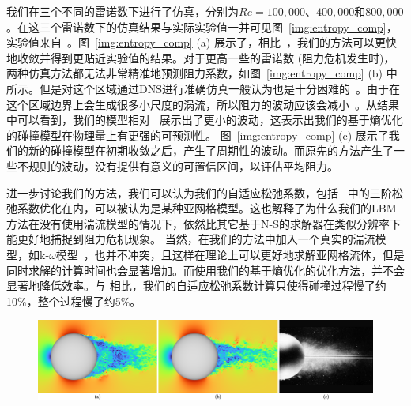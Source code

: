 我们在三个不同的雷诺数下进行了仿真，分别为$Re=100,000$、$400,000$和$800,000$。在这三个雷诺数下的仿真结果与实际实验值一并可见图~\ref{img:entropy_comp}，实验值来自~\cite{Barati-2014}。图~\ref{img:entropy_comp} (a) 展示了，相比~\cite{Geier-2017}，我们的方法可以更快地收敛并得到更贴近实验值的结果。对于更高一些的雷诺数 (阻力危机发生时)，两种仿真方法都无法非常精准地预测阻力系数，如图~\ref{img:entropy_comp} (b) 中所示。但是对这个区域通过DNS进行准确仿真一般认为也是十分困难的~\cite{Tiwari-2020}。由于在这个区域边界上会生成很多小尺度的涡流，所以阻力的波动应该会减小~\cite{Deshpande-2017}。从结果中可以看到，我们的模型相对~\cite{Geier-2017} 展示出了更小的波动，这表示出我们的基于熵优化的碰撞模型在物理量上有更强的可预测性。
图~\ref{img:entropy_comp} (c) 展示了我们的新的碰撞模型在初期收敛之后，产生了周期性的波动。而原先的方法产生了一些不规则的波动，没有提供有意义的可置信区间，以评估平均阻力。

进一步讨论我们的方法，我们可以认为我们的自适应松弛系数，包括~\cite{Geier-2017} 中的三阶松弛系数优化在内，可以被认为是某种亚网格模型。这也解释了为什么我们的LBM方法在没有使用湍流模型的情况下，依然比其它基于N-S的求解器在类似分辨率下能更好地捕捉到阻力危机现象。
当然，在我们的方法中加入一个真实的湍流模型，如k-$\omega$模型~\cite{Menter-1994}，也并不冲突，且这样在理论上可以更好地求解亚网格流体，但是同时求解的计算时间也会显著增加。而使用我们的基于熵优化的优化方法，并不会显著地降低效率。与 \cite{Geier-2017} 相比，我们的自适应松弛系数计算只使得碰撞过程慢了约10\%，整个过程慢了约5\%。

\begin{figure}[htb]
  \centering
    \includegraphics[width=0.99\columnwidth]{figures/wake_comp.png}
  \label{img:sphere_wake_comp}
\end{figure}

